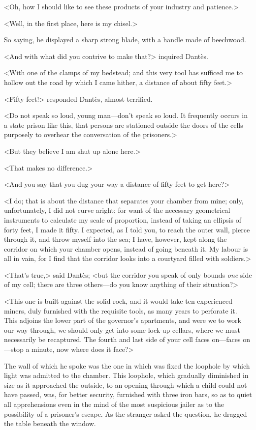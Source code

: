<Oh, how I should like to see these products of your industry and patience.> 

 <Well, in the first place, here is my chisel.> 

 So saying, he displayed a sharp strong blade, with a handle made of beechwood. 

 <And with what did you contrive to make that?> inquired Dantès. 

 <With one of the clamps of my bedstead; and this very tool has sufficed me to hollow out the road by which I came hither, a distance of about fifty feet.> 

 <Fifty feet!> responded Dantès, almost terrified. 

 <Do not speak so loud, young man—don't speak so loud. It frequently occurs in a state prison like this, that persons are stationed outside the doors of the cells purposely to overhear the conversation of the prisoners.> 

 <But they believe I am shut up alone here.> 

 <That makes no difference.> 

 <And you say that you dug your way a distance of fifty feet to get here?> 

 <I do; that is about the distance that separates your chamber from mine; only, unfortunately, I did not curve aright; for want of the necessary geometrical instruments to calculate my scale of proportion, instead of taking an ellipsis of forty feet, I made it fifty. I expected, as I told you, to reach the outer wall, pierce through it, and throw myself into the sea; I have, however, kept along the corridor on which your chamber opens, instead of going beneath it. My labour is all in vain, for I find that the corridor looks into a courtyard filled with soldiers.> 

 <That's true,> said Dantès; <but the corridor you speak of only bounds \textit{one} side of my cell; there are three others—do you know anything of their situation?> 

 <This one is built against the solid rock, and it would take ten experienced miners, duly furnished with the requisite tools, as many years to perforate it. This adjoins the lower part of the governor's apartments, and were we to work our way through, we should only get into some lock-up cellars, where we must necessarily be recaptured. The fourth and last side of your cell faces on—faces on—stop a minute, now where does it face?> 

 The wall of which he spoke was the one in which was fixed the loophole by which light was admitted to the chamber. This loophole, which gradually diminished in size as it approached the outside, to an opening through which a child could not have passed, was, for better security, furnished with three iron bars, so as to quiet all apprehensions even in the mind of the most suspicious jailer as to the possibility of a prisoner's escape. As the stranger asked the question, he dragged the table beneath the window. 

